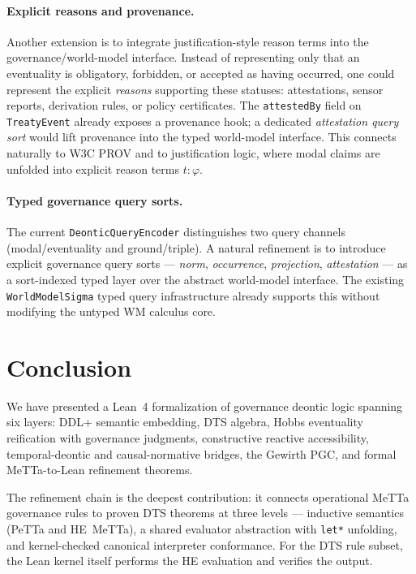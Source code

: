 \documentclass[]{article}
\newcommand{\code}[1]{\texttt{#1}}
\newcommand{\DDL}{\textup{DDL+}}
\newcommand{\DTS}{\textup{DTS}}
\newcommand{\PGC}{\textup{PGC}}
\begin{document}
\paragraph{Explicit reasons and provenance.}
Another extension is to integrate justification-style reason
terms into the governance/world-model interface.  Instead of
representing only that an eventuality is obligatory, forbidden, or
accepted as having occurred, one could represent the explicit
\emph{reasons} supporting these statuses: attestations, sensor reports,
derivation rules, or policy certificates.  The \code{attestedBy} field
on \code{TreatyEvent} already exposes a provenance hook; a dedicated
\emph{attestation query sort} would lift provenance into the typed
world-model interface.  This connects naturally to W3C PROV and to
justification logic, where modal claims are unfolded into explicit
reason terms $t : \varphi$.

\paragraph{Typed governance query sorts.}
The current \code{DeonticQueryEncoder} distinguishes two query channels
(modal/eventuality and ground/triple).  A natural refinement is to
introduce explicit governance query sorts --- \emph{norm}, \emph{occurrence},
\emph{projection}, \emph{attestation} --- as a sort-indexed typed layer
over the abstract world-model interface.  The existing \code{WorldModelSigma}
typed query infrastructure already supports this without modifying the
untyped WM calculus core.

\section{Conclusion}
\label{sec:conclusion}

We have presented a Lean~4 formalization of governance deontic logic
spanning six layers: \DDL{} semantic embedding, \DTS{} algebra, Hobbs
eventuality reification with governance judgments, constructive reactive
accessibility, temporal-deontic and causal-normative bridges, the
Gewirth \PGC{}, and formal MeTTa-to-Lean refinement theorems.

The refinement chain is the deepest contribution: it connects
operational MeTTa governance rules to proven \DTS{} theorems at three
levels --- inductive semantics (PeTTa and HE~MeTTa), a shared evaluator
abstraction with \code{let*} unfolding, and kernel-checked canonical
interpreter conformance.  For the DTS rule subset, the Lean kernel
itself performs the HE evaluation and verifies the output.
\end{document}
